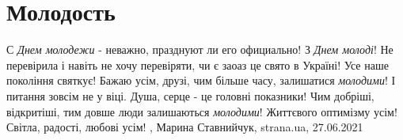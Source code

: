  
 
 
 
 
\chapter{Молодость}

С \emph{Днем молодежи} - неважно, празднуют ли его официально!  З \emph{Днем молоді}!  Не
перевірила і навіть не хочу перевіряти, чи є заоаз це свято в Україні!  Усе
наше покоління святкує!  Бажаю усім, друзі, чим більше часу, залишатися
\emph{молодими}!  І питання зовсім не у віці.  Душа, серце - це головні показники!
Чим добріші, відкритіші, тим довше люди залишаються \emph{молодими}!  Життєвого
оптимізму усім!  Світла, радості, любові усім!
, 
Марина Ставнийчук, strana.ua, 27.06.2021
